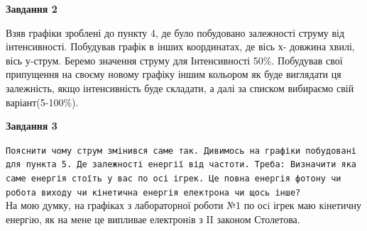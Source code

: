 \documentclass[a4paper,14pt]{extreport}
\begin{document}
	
	
	

\textbf{Завдання 2}
	
Взяв графіки зроблені до пункту 4, де було побудовано залежності струму від інтенсивності. Побудував графік в інших координатах, де вісь х- довжина хвилі, вісь у-струм. Беремо значення струму для Інтенсивності 50\%. Побудував свої припущення на своєму новому графіку іншим кольором як буде виглядати ця залежність, якщо інтенсивність буде складати, а далі за списком вибираємо свій варіант(5-100\%).
	\begin{center}
	\begin{figure}[h!]
		\label{ris2}
	\end{figure}
	\end{center}
	
	

\textbf{Завдання 3}

\texttt{Пояснити чому струм змінився саме так. Дивимось на графіки побудовані для пункта 5. Де залежності енергії від частоти. Треба:
		 Визначити яка саме енергія стоїть у вас по осі ігрек. Це повна енергія фотону чи робота виходу чи кінетична енергія електрона чи щось інше? }\\

	На мою думку, на графіках з лабораторної роботи №1  по осi ігрек  маю кiнетичну енергiю, як на мене це випливае  електронiв з II законом Столетова.
\end{document}
